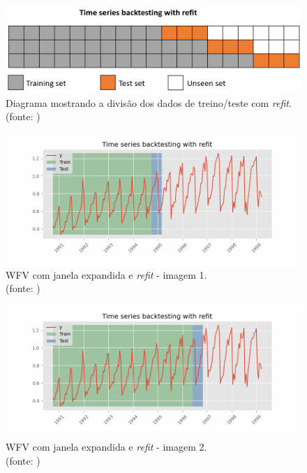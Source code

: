 \begin{figure}[!h]
	\centering
	\includegraphics[scale=0.3]{Figuras/skforecast-diagram-backtesting-refit.png}
	\caption{Diagrama mostrando a divisão dos dados de treino/teste com \textit{refit}.\\(fonte: \cite{skforecast_a})}
	\label{fig:skforecast-diagram-backtesting-refit}
\end{figure}

\begin{figure}[!h]
	\centering
	\includegraphics[scale=0.3]{Figuras/imagem1_skforecast-backtesting-refit.png}
	\caption{WFV com janela expandida e \textit{refit} - imagem 1.\\(fonte: \cite{skforecast_a})}
	\label{fig:imagem1_skforecast-backtesting-refit}
\end{figure}

\begin{figure}[!h]
	\centering
	\includegraphics[scale=0.3]{Figuras/imagem2_skforecast-backtesting-refit.png}
	\caption{WFV com janela expandida e \textit{refit} - imagem 2.\\(fonte: \cite{skforecast_a})}
	\label{fig:imagem2_skforecast-backtesting-refit}
\end{figure}

